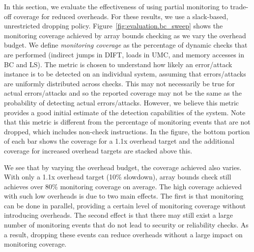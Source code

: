 In this section, we evaluate the effectiveness of
using partial monitoring to trade-off coverage for reduced overheads.
For these results, we use a slack-based, unrestricted dropping policy.
Figure~\ref{fig:evaluation.bc_sweep} shows the monitoring coverage achieved by
array bounds checking as we vary the overhead budget. 
We define \emph{monitoring coverage} as the 
percentage of dynamic checks that are performed 
(indirect jumps in DIFT, loads in UMC, and memory accesses in BC and LS). 
The metric is chosen to understand
how likely an error/attack instance is to be detected on an individual system, 
assuming that errors/attacks are uniformly distributed across checks. This may
not necessarily be true for actual errors/attacks and so the reported coverage
may not be the same as the probability of detecting actual errors/attacks.
However, we believe this metric
provides a good initial estimate of the detection capabilities of the system.
Note that this metric is different from the
percentage of monitoring events that are not dropped, which includes
non-check instructions.
In the figure, the bottom portion of each
bar shows the coverage for a 1.1x overhead target and the additional
coverage for increased overhead targets are stacked above this.

We see that by varying the overhead budget, the coverage achieved also varies.
With only a 1.1x overhead target (10\% slowdown), array bounds check still
achieves over 80\% monitoring coverage on average. The high coverage
achieved with such low overheads is due to two main effects.  The first is that
monitoring can be done in parallel, providing a certain level of monitoring coverage without
introducing overheads. The second effect is that there may still exist a large number of
monitoring events that do not lead to security or reliability checks. As a
result, dropping these events can reduce overheads without a large impact on
monitoring coverage.

